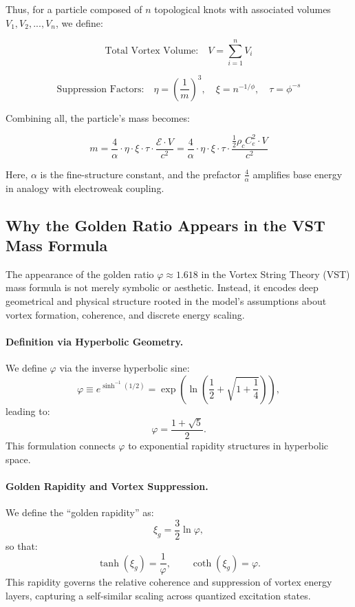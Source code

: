 \documentclass[11pt]{article}
\begin{document}
    Thus, for a particle composed of \( n \) topological knots with associated volumes \( V_1, V_2, ..., V_n \), we define:

    \[
        \text{Total Vortex Volume:} \quad V = \sum_{i=1}^{n} V_i
    \]

    \[
        \text{Suppression Factors:} \quad
        \eta = \left( \frac{1}{m} \right)^3, \quad
        \xi = n^{-1/\phi}, \quad
        \tau = \phi^{-s}
    \]

    Combining all, the particle's mass becomes:

    \[
        m = \frac{4}{\alpha} \cdot \eta \cdot \xi \cdot \tau \cdot \frac{\mathcal{E} \cdot V}{c^2}
        = \frac{4}{\alpha} \cdot \eta \cdot \xi \cdot \tau \cdot \frac{ \frac{1}{2} \rho_c C_e^2 \cdot V }{c^2}
    \]

    Here, \( \alpha \) is the fine-structure constant, and the prefactor \( \frac{4}{\alpha} \) amplifies base energy in analogy with electroweak coupling.

    \subsection{Why the Golden Ratio Appears in the VST Mass Formula}

    The appearance of the golden ratio \( \varphi \approx 1.618 \) in the Vortex String Theory (VST) mass formula is not merely symbolic or aesthetic. Instead, it encodes deep geometrical and physical structure rooted in the model's assumptions about vortex formation, coherence, and discrete energy scaling.

    \paragraph{Definition via Hyperbolic Geometry.}
    We define \( \varphi \) via the inverse hyperbolic sine:
    \begin{equation}
        \varphi \equiv e^{\sinh^{-1}(1/2)} = \exp\left(\ln\left( \frac{1}{2} + \sqrt{1 + \frac{1}{4}} \right)\right),
    \end{equation}
    leading to:
    \begin{equation}
        \varphi = \frac{1 + \sqrt{5}}{2}.
    \end{equation}
    This formulation connects \( \varphi \) to exponential rapidity structures in hyperbolic space.

    \paragraph{Golden Rapidity and Vortex Suppression.}
    We define the ``golden rapidity'' as:
    \begin{equation}
        \xi_g = \frac{3}{2} \ln \varphi,
    \end{equation}
    so that:
    \begin{equation}
        \tanh(\xi_g) = \frac{1}{\varphi}, \qquad \coth(\xi_g) = \varphi.
    \end{equation}
    This rapidity governs the relative coherence and suppression of vortex energy layers, capturing a self-similar scaling across quantized excitation states.
\end{document}
